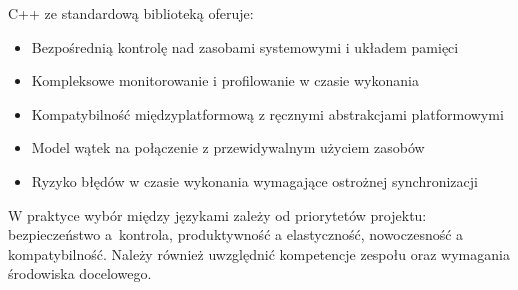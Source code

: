 C++ ze standardową biblioteką oferuje:
\begin{itemize}
    \item Bezpośrednią kontrolę nad zasobami systemowymi i układem pamięci
    \item Kompleksowe monitorowanie i profilowanie w czasie wykonania  
    \item Kompatybilność międzyplatformową z ręcznymi abstrakcjami platformowymi
    \item Model wątek na połączenie z przewidywalnym użyciem zasobów
    \item Ryzyko błędów w czasie wykonania wymagające ostrożnej synchronizacji
\end{itemize}

W praktyce wybór między językami zależy od priorytetów projektu: bezpieczeństwo a~kontrola, produktywność a elastyczność, nowoczesność a kompatybilność. Należy również uwzględnić kompetencje zespołu oraz wymagania środowiska docelowego.
